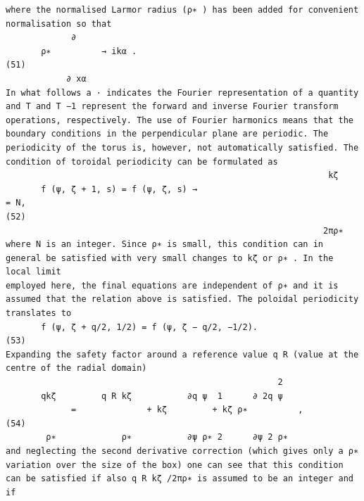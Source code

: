 \documentclass[a4paper]{article}
\newcommand{\gkwpagefont}{\fontsize{6.0pt}{7.55pt}\selectfont}
\begin{document}
\begin{Verbatim}[fontsize=\gkwpagefont]
where the normalised Larmor radius (ρ∗ ) has been added for convenient normalisation so that
             ∂
       ρ∗          → ikα .                                                                                                                    (51)
            ∂ xα
In what follows a · indicates the Fourier representation of a quantity and T and T −1 represent the forward and inverse Fourier transform
operations, respectively. The use of Fourier harmonics means that the boundary conditions in the perpendicular plane are periodic. The
periodicity of the torus is, however, not automatically satisfied. The condition of toroidal periodicity can be formulated as
                                                                kζ
       f (ψ, ζ + 1, s) = f (ψ, ζ, s) →                                = N,                                                                    (52)
                                                               2πρ∗
where N is an integer. Since ρ∗ is small, this condition can in general be satisfied with very small changes to kζ or ρ∗ . In the local limit
employed here, the final equations are independent of ρ∗ and it is assumed that the relation above is satisfied. The poloidal periodicity
translates to
       f (ψ, ζ + q/2, 1/2) = f (ψ, ζ − q/2, −1/2).                                                                                            (53)
Expanding the safety factor around a reference value q R (value at the centre of the radial domain)
                                                      2
       qkζ         q R kζ           ∂q ψ  1      ∂ 2q ψ
             =              + kζ         + kζ ρ∗          ,                                                                                   (54)
        ρ∗             ρ∗           ∂ψ ρ∗ 2      ∂ψ 2 ρ∗
and neglecting the second derivative correction (which gives only a ρ∗ variation over the size of the box) one can see that this condition
can be satisfied if also q R kζ /2πρ∗ is assumed to be an integer and if
                                                       

\end{Verbatim}
\end{document}
